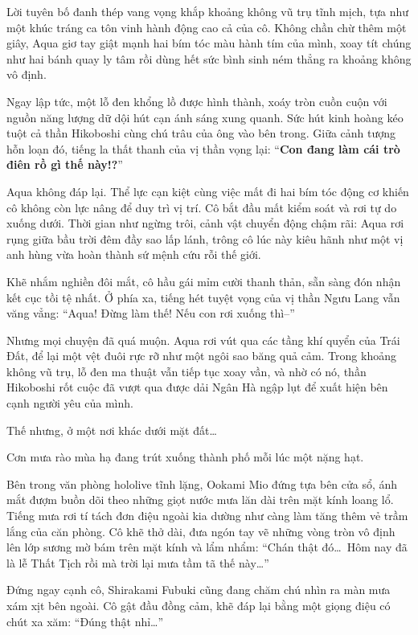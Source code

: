 \documentclass[../main.tex]{subfiles}
\begin{document}
Lời tuyên bố đanh thép vang vọng khắp khoảng không vũ trụ tĩnh mịch, tựa như một khúc tráng ca tôn vinh hành động cao cả của cô. Không chần chừ thêm một giây, Aqua giơ tay giật mạnh hai bím tóc màu hành tím của mình, xoay tít chúng như hai bánh quay ly tâm rồi dùng hết sức bình sinh ném thẳng ra khoảng không vô định.


Ngay lập tức, một lỗ đen khổng lồ được hình thành, xoáy tròn cuồn cuộn với nguồn năng lượng dữ dội hút cạn ánh sáng xung quanh. Sức hút kinh hoàng kéo tuột cả thần Hikoboshi cùng chú trâu của ông vào bên trong. Giữa cảnh tượng hỗn loạn đó, tiếng la thất thanh của vị thần vọng lại: ``\textbf{Con đang làm cái trò điên rồ gì thế này!?}''

Aqua không đáp lại. Thể lực cạn kiệt cùng việc mất đi hai bím tóc động cơ khiến cô không còn lực nâng để duy trì vị trí. Cô bắt đầu mất kiểm soát và rơi tự do xuống dưới. Thời gian như ngừng trôi, cảnh vật chuyển động chậm rãi: Aqua rơi rụng giữa bầu trời đêm đầy sao lấp lánh, trông cô lúc này kiêu hãnh như một vị anh hùng vừa hoàn thành sứ mệnh cứu rỗi thế giới.


Khẽ nhắm nghiền đôi mắt, cô hầu gái mỉm cười thanh thản, sẵn sàng đón nhận kết cục tồi tệ nhất. Ở phía xa, tiếng hét tuyệt vọng của vị thần Ngưu Lang vẫn văng vẳng: ``Aqua! Đừng làm thế! Nếu con rơi xuống thì--''

Nhưng mọi chuyện đã quá muộn. Aqua rơi vút qua các tầng khí quyển của Trái Đất, để lại một vệt đuôi rực rỡ như một ngôi sao băng quả cảm. Trong khoảng không vũ trụ, lỗ đen ma thuật vẫn tiếp tục xoay vần, và nhờ có nó, thần Hikoboshi rốt cuộc đã vượt qua được dải Ngân Hà ngập lụt để xuất hiện bên cạnh người yêu của mình.

Thế nhưng, ở một nơi khác dưới mặt đất\dots

\ct

Cơn mưa rào mùa hạ đang trút xuống thành phố mỗi lúc một nặng hạt.

Bên trong văn phòng hololive tĩnh lặng, Ookami Mio đứng tựa bên cửa sổ, ánh mắt đượm buồn dõi theo những giọt nước mưa lăn dài trên mặt kính loang lổ. Tiếng mưa rơi tí tách đơn điệu ngoài kia dường như càng làm tăng thêm vẻ trầm lắng của căn phòng. Cô khẽ thở dài, đưa ngón tay vẽ những vòng tròn vô định lên lớp sương mờ bám trên mặt kính và lẩm nhẩm: ``Chán thật đó\dots\ Hôm nay đã là lễ Thất Tịch rồi mà trời lại mưa tầm tã thế này\dots''

Đứng ngay cạnh cô, Shirakami Fubuki cũng đang chăm chú nhìn ra màn mưa xám xịt bên ngoài. Cô gật đầu đồng cảm, khẽ đáp lại bằng một giọng điệu có chút xa xăm: ``Đúng thật nhỉ\dots''
\end{document}
